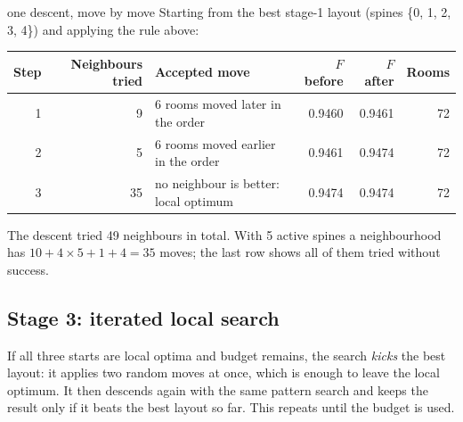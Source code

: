 \documentclass[10pt,a4paper]{article}
\begin{document}
\begin{example}{one descent, move by move}
Starting from the best stage-1 layout (spines \{0, 1, 2, 3, 4\}) and applying the rule above:
\begin{center}\centering\small
\begin{tabular}{@{}r r p{6.2cm} r r r@{}}
\toprule
\textbf{Step} & \textbf{Neighbours tried} & \textbf{Accepted move} & \textbf{$F$ before} & \textbf{$F$ after} & \textbf{Rooms} \\ \midrule
1 & 9 & 6 rooms moved later in the order & 0.9460 & 0.9461 & 72 \\
2 & 5 & 6 rooms moved earlier in the order & 0.9461 & 0.9474 & 72 \\
3 & 35 & no neighbour is better: local optimum & 0.9474 & 0.9474 & 72 \\
\bottomrule
\end{tabular}
\end{center}
The descent tried 49 neighbours in total. With 5 active spines a neighbourhood has
$10 + 4 \times 5 + 1 + 4 = 35$ moves; the last row shows all of them tried without success.
\end{example}

\subsection{Stage 3: iterated local search}
If all three starts are local optima and budget remains, the search \emph{kicks} the best layout: it applies two
random moves at once, which is enough to leave the local optimum. It then descends again with the same pattern search
and keeps the result only if it beats the best layout so far. This repeats until the budget is used.
\end{document}
